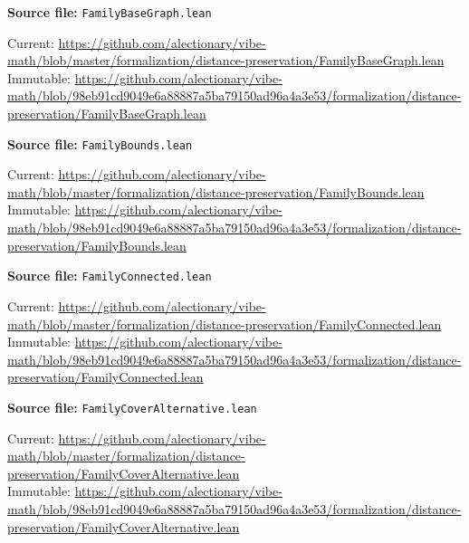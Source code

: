 \par\smallskip\noindent\begin{minipage}{\linewidth}\small\setlength{\baselineskip}{11pt}
\textbf{Source file:} \nolinkurl{FamilyBaseGraph.lean}\par\nopagebreak
Current: \url{https://github.com/alectionary/vibe-math/blob/master/formalization/distance-preservation/FamilyBaseGraph.lean}\\
Immutable: \url{https://github.com/alectionary/vibe-math/blob/98eb91cd9049e6a88887a5ba79150ad96a4a3e53/formalization/distance-preservation/FamilyBaseGraph.lean}\par\end{minipage}\par
\par\smallskip\noindent\begin{minipage}{\linewidth}\small\setlength{\baselineskip}{11pt}
\textbf{Source file:} \nolinkurl{FamilyBounds.lean}\par\nopagebreak
Current: \url{https://github.com/alectionary/vibe-math/blob/master/formalization/distance-preservation/FamilyBounds.lean}\\
Immutable: \url{https://github.com/alectionary/vibe-math/blob/98eb91cd9049e6a88887a5ba79150ad96a4a3e53/formalization/distance-preservation/FamilyBounds.lean}\par\end{minipage}\par
\par\smallskip\noindent\begin{minipage}{\linewidth}\small\setlength{\baselineskip}{11pt}
\textbf{Source file:} \nolinkurl{FamilyConnected.lean}\par\nopagebreak
Current: \url{https://github.com/alectionary/vibe-math/blob/master/formalization/distance-preservation/FamilyConnected.lean}\\
Immutable: \url{https://github.com/alectionary/vibe-math/blob/98eb91cd9049e6a88887a5ba79150ad96a4a3e53/formalization/distance-preservation/FamilyConnected.lean}\par\end{minipage}\par
\par\smallskip\noindent\begin{minipage}{\linewidth}\small\setlength{\baselineskip}{11pt}
\textbf{Source file:} \nolinkurl{FamilyCoverAlternative.lean}\par\nopagebreak
Current: \url{https://github.com/alectionary/vibe-math/blob/master/formalization/distance-preservation/FamilyCoverAlternative.lean}\\
Immutable: \url{https://github.com/alectionary/vibe-math/blob/98eb91cd9049e6a88887a5ba79150ad96a4a3e53/formalization/distance-preservation/FamilyCoverAlternative.lean}\par\end{minipage}\par
